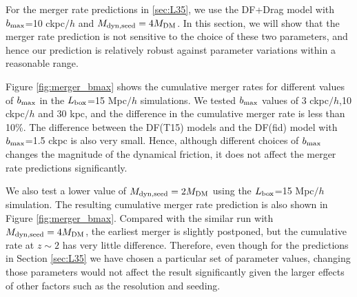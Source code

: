 For the merger rate predictions in \ref{sec:L35}, we use the DF+Drag model with $b_{\rm max}$=10 ckpc$/h$ and $M_{\rm dyn,seed} = 4M_{\rm DM}$. In this section, we will show that the merger rate prediction is not sensitive to the choice of these two parameters, and hence our prediction is relatively robust against parameter variations within a reasonable range.

Figure \ref{fig:merger_bmax} shows the cumulative merger rates for different values of $b_{\rm max}$ in the $L_{\rm  box}$=15 Mpc$/h$ simulations. We tested $b_{\rm max}$ values of 3 ckpc$/h$,10 ckpc$/h$ and 30 kpc, and the difference in the cumulative merger rate is less than 10\%. The difference between the DF(T15) models and the DF(fid) model with $b_{\rm max}$=1.5 ckpc is also very small. Hence, although different choices of $b_{\rm max}$ changes the magnitude of the dynamical friction, it does not affect the merger rate predictions significantly.

We also test a lower value of $M_{\rm dyn, seed}=2M_{\rm DM}$ using the $L_{\rm  box}$=15 Mpc$/h$ simulation. The resulting cumulative merger rate prediction is also shown in Figure \ref{fig:merger_bmax}. Compared with the similar run with $M_{\rm dyn, seed}=4M_{\rm DM}$, the earliest merger is slightly postponed, but the cumulative rate at $z\sim 2$ has very little difference. Therefore, even though for the predictions in Section \ref{sec:L35} we have chosen a particular set of parameter values, changing those parameters would not affect the result significantly given the larger effects of other factors such as the resolution and seeding.
 